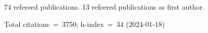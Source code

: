 74 refereed publications. 13 refeered publications as first author.

Total citations~=~3750; h-index~=~34 (2024-01-18)